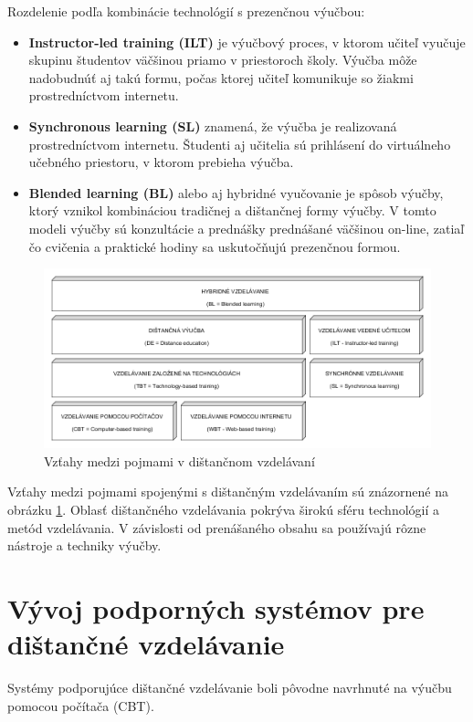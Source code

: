 \documentclass[10pt,oneside,slovak,a4paper]{article}
\begin{document}
Rozdelenie podľa kombinácie technológií s prezenčnou výučbou:
\begin{itemize}
	\item \textbf{Instructor-led training (ILT)} je výučbový proces, v ktorom učiteľ vyučuje skupinu študentov väčšinou priamo v priestoroch školy. Výučba môže nadobudnúť aj takú formu, počas ktorej učiteľ komunikuje so žiakmi prostredníctvom internetu.
	\item \textbf{Synchronous learning (SL)} znamená, že výučba je realizovaná prostredníctvom internetu. Študenti aj učitelia sú prihlásení do virtuálneho učebného priestoru, v ktorom prebieha výučba.
	\item \textbf{Blended learning (BL)} alebo aj hybridné vyučovanie je spôsob výučby, ktorý vznikol kombináciou tradičnej a dištančnej formy výučby. V tomto modeli výučby sú konzultácie a prednášky prednášané väčšinou on-line, zatiaľ čo cvičenia a praktické hodiny sa uskutočňujú prezenčnou formou.
\end{itemize}


\begin{figure}[h]
	\centering
	\includegraphics[width=\textwidth]{Vztahy_DE.png}
	\caption{Vzťahy medzi pojmami v dištančnom vzdelávaní\cite{WiktorzakKotowski}}
	\label{Vztahy_medzi_pojmami}
\end{figure}

Vzťahy medzi pojmami spojenými s dištančným vzdelávaním sú znázornené na obrázku \ref{Vztahy_medzi_pojmami}.%
Oblasť dištančného vzdelávania pokrýva širokú sféru technológií a metód vzdelávania.
V závislosti od prenášaného obsahu sa používajú rôzne nástroje a techniky výučby.

\section{Vývoj podporných systémov pre dištančné vzdelávanie}
\label{Vyvojsys}
Systémy podporujúce dištančné vzdelávanie boli pôvodne navrhnuté na výučbu pomocou počítača (CBT)\cite{WiktorzakKotowski}.
\end{document}
